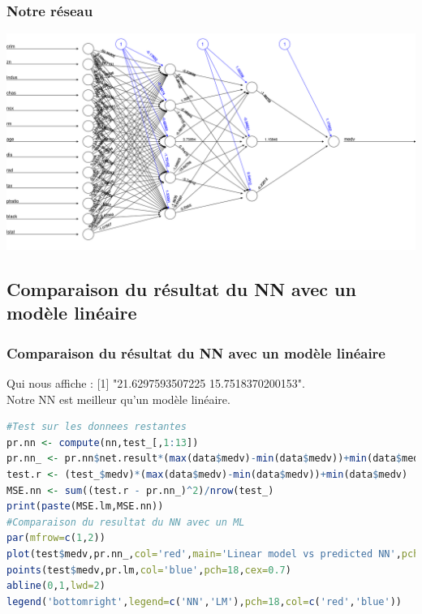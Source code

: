 \documentclass[compress]{beamer}
\begin{document}
\begin{frame}\frametitle{Notre réseau}
	\includegraphics[width=\linewidth]{img/nn_boston}
\end{frame}	


\subsection{Comparaison du résultat du NN avec un modèle linéaire}
\begin{frame}[fragile]
	\frametitle{Comparaison du résultat du NN avec un modèle linéaire}
Qui nous affiche : [1] "21.6297593507225 15.7518370200153".\\
Notre NN est meilleur qu'un modèle linéaire.
\begin{lstlisting}[language=R]
#Test sur les donnees restantes
pr.nn <- compute(nn,test_[,1:13])
pr.nn_ <- pr.nn$net.result*(max(data$medv)-min(data$medv))+min(data$medv)
test.r <- (test_$medv)*(max(data$medv)-min(data$medv))+min(data$medv)
MSE.nn <- sum((test.r - pr.nn_)^2)/nrow(test_)
print(paste(MSE.lm,MSE.nn)) 
#Comparaison du resultat du NN avec un ML
par(mfrow=c(1,2))
plot(test$medv,pr.nn_,col='red',main='Linear model vs predicted NN',pch=18,cex=0.7)
points(test$medv,pr.lm,col='blue',pch=18,cex=0.7)
abline(0,1,lwd=2)
legend('bottomright',legend=c('NN','LM'),pch=18,col=c('red','blue'))
	\end{lstlisting}
\end{frame}
\end{document}
